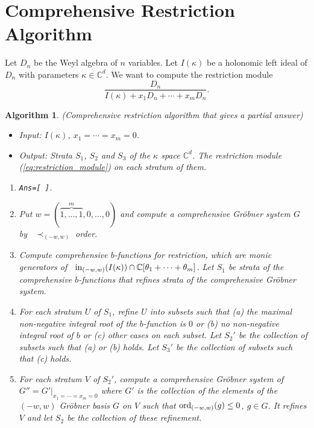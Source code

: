 \documentclass{article}
\def\CC{\mathbb{C}}
\newtheorem{algorithm}{Algorithm}
\begin{document}
\section{Comprehensive Restriction Algorithm} \label{sec:restriction}

Let $D_n$ be the Weyl algebra of $n$ variables.
Let $I(\kappa)$ be a holonomic left ideal of $D_n$ 
with parameters $\kappa \in \CC^d$.
We want to compute the restriction module
\begin{equation}  \label{eq:restriction_module}
 \frac{D_n}{I(\kappa)+x_1 D_n + \cdots + x_m D_n}.
\end{equation}

\begin{algorithm}{\rm (Comprehensive restriction algorithm that gives 
a partial answer)}   \label{alg:alg-rest-top} \rm
\begin{itemize}
\item Input: $I(\kappa)$, $x_1=\cdots=x_m=0$. 
\item Output: Strata $S_1$, $S_2$ and $S_3$ of the $\kappa$ space $\CC^d$.
The restriction module (\ref{eq:restriction_module}) on each stratum of them. 
\end{itemize}
\begin{enumerate}
\item {\tt Ans=[\,]}.
\item Put $w=(\overbrace{1,\ldots,1}^{m}, 0, \ldots, 0)$ and compute
a comprehensive Gr\"obner system $G$ by \, $\prec_{(-w,w)}$ order.
\item Compute comprehensive $b$-functions for restriction, which are monic generators
of \, ${\rm in}_{(-w,w)}(I(\kappa)) \cap \CC[\theta_1+\cdots+\theta_m]$.
Let $S_1$ be strata of the comprehensive $b$-functions that refines strata 
of the comprehensive Gr\"obner system.
\item For each stratum $U$ of $S_1$, refine $U$ into subsets such that 
(a) the maximal non-negative integral root
of the $b$-function is $0$ or (b) no non-negative integral root of $b$ or (c) other cases on each subset.
Let $S_2'$ be the collection of subsets such that (a) or (b) holds.
Let $S_3'$ be the collection of subsets such that (c) holds.
\item For each stratum $V$ of $S_2'$,
compute a comprehensive Gr\"obner system of $G''=G'|_{x_1=\cdots=x_m=0}$
where $G'$ is the collection of the elements of the $(-w,w)$ Gr\"obner basis $G$
on $V$
such that ${\rm ord}_{(-w,w)}(g) \leq 0$,  $g \in G$.
It refines $V$ and let $S_2$ be the collection of these refinement.
\begin{enumerate}

\end{enumerate}
\end{enumerate}
\end{algorithm}
\end{document}
